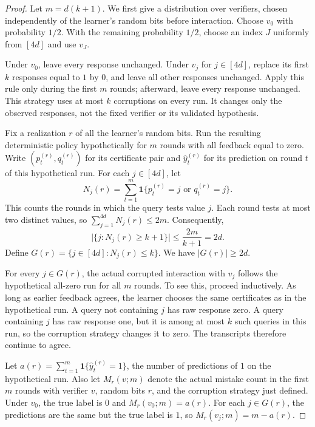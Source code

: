 \documentclass[11pt]{article}
\newcommand{\ind}{\mathbf 1}
\begin{document}
\begin{proof}
Let $m=d(k+1)$. We first give a distribution over verifiers, chosen
independently of the learner's random bits before interaction. Choose $v_0$
with probability $1/2$. With the remaining probability $1/2$, choose an
index $J$ uniformly from $[4d]$ and use $v_J$.

Under $v_0$, leave every response unchanged. Under $v_j$ for $j\in[4d]$,
replace its first $k$ responses equal to $1$ by $0$, and leave all other
responses unchanged. Apply this rule only during the first $m$ rounds;
afterward, leave every response unchanged. This strategy uses at most $k$
corruptions on every run. It changes only the observed responses, not the
fixed verifier or its validated hypothesis.

Fix a realization $r$ of all the learner's random bits. Run the resulting
deterministic policy hypothetically for $m$ rounds with all feedback equal
to zero. Write $(p_t^{(r)},q_t^{(r)})$ for its certificate pair and
$\hat y_t^{(r)}$ for its prediction on round $t$ of this hypothetical run.
For each $j\in[4d]$, let
\[
N_j(r)=\sum_{t=1}^m
\ind\{p_t^{(r)}=j\text{ or }q_t^{(r)}=j\}.
\]
This counts the rounds in which the query tests value $j$. Each round tests
at most two distinct values, so $\sum_{j=1}^{4d}N_j(r)\le2m$.
Consequently,
\[
\bigl|\{j:N_j(r)\ge k+1\}\bigr|
\le\frac{2m}{k+1}=2d.
\]
Define $G(r)=\{j\in[4d]:N_j(r)\le k\}$. We have $|G(r)|\ge2d$.

For every $j\in G(r)$, the actual corrupted interaction with $v_j$ follows
the hypothetical all-zero run for all $m$ rounds. To see this, proceed
inductively. As long as earlier feedback agrees, the learner chooses the
same certificates as in the hypothetical run. A query not containing $j$
has raw response zero. A query containing $j$ has raw response one, but it
is among at most $k$ such queries in this run, so the corruption strategy
changes it to zero. The transcripts therefore continue to agree.

Let $a(r)=\sum_{t=1}^m\ind\{\hat y_t^{(r)}=1\}$, the number of predictions
of $1$ on the hypothetical run. Also let $M_r(v;m)$ denote the actual
mistake count in the first $m$ rounds with verifier $v$, random bits $r$,
and the corruption strategy just defined. Under $v_0$, the true label is
$0$ and $M_r(v_0;m)=a(r)$. For each $j\in G(r)$, the predictions are the
same but the true label is $1$, so $M_r(v_j;m)=m-a(r)$.


\end{proof}
\end{document}

